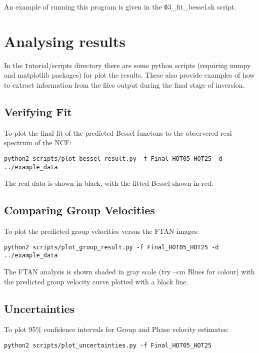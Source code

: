 \documentclass{article}
\begin{document}
An example of running this program is given in the {\texttt 03\_fit\_bessel.sh} script.

\section{Analysing results}

In the {\texttt tutorial/scripts} directory there are some python scripts
(requiring numpy and matplotlib packages) for plot the results. These also
provide examples of how to extract information from the files output
during the final stage of inversion.

\subsection{Verifying Fit}

To plot the final fit of the predicted Bessel functons to the
observered real spectrum of the NCF:

\begin{verbatim}
python2 scripts/plot_bessel_result.py -f Final_HOT05_HOT25 -d ../example_data
\end{verbatim}

The real data is shown in black, with the fitted Bessel shown in red.

\subsection{Comparing Group Velocities}

To plot the predicted group velocities versus the FTAN images:

\begin{verbatim}
python2 scripts/plot_group_result.py -f Final_HOT05_HOT25 -d ../example_data
\end{verbatim}

The FTAN analysis is shown shaded in gray scale (try --cm Blues for
colour) with the predicted group velocity curve plotted with a black
line.

\subsection{Uncertainties}

To plot 95\% confidence intervals for Group and Phase velocity
estimates:

\begin{verbatim}
python2 scripts/plot_uncertainties.py -f Final_HOT05_HOT25
\end{verbatim}
\end{document}
